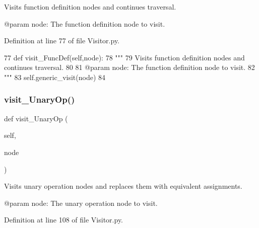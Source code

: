 \begin{DoxyVerb}Visits function definition nodes and continues traversal.

@param node: The function definition node to visit.
\end{DoxyVerb}
 

Definition at line 77 of file Visitor.\+py.


\begin{DoxyCode}
77     \textcolor{keyword}{def }visit\_FuncDef(self,node):
78         \textcolor{stringliteral}{"""
}
79 \textcolor{stringliteral}{        Visits function definition nodes and continues traversal.
}
80 \textcolor{stringliteral}{
}
81 \textcolor{stringliteral}{        @param node: The function definition node to visit.
}
82 \textcolor{stringliteral}{        """}
83         self.generic\_visit(node)
84 
\end{DoxyCode}
\mbox{\label{classPostProcessor_1_1Visitor_1_1NegationVisitor_ad32412c74dc29affe693267c23ea968a}} 
\subsubsection{\texorpdfstring{visit\+\_\+\+Unary\+Op()}{visit\_UnaryOp()}}
{\footnotesize\ttfamily def visit\+\_\+\+Unary\+Op (\begin{DoxyParamCaption}\item[{}]{self,  }\item[{}]{node }\end{DoxyParamCaption})}

\begin{DoxyVerb}Visits unary operation nodes and replaces them with equivalent assignments.

@param node: The unary operation node to visit.
\end{DoxyVerb}
 

Definition at line 108 of file Visitor.\+py.


